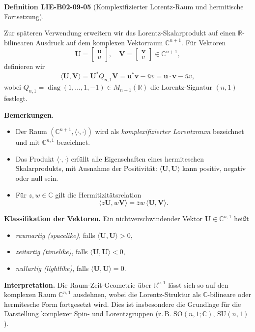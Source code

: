 \documentclass[10pt, letterpaper]{article}
\newcommand{\CustomHeading}[3]{%
  \par\medskip\noindent%
  \textbf{#1 #2} \textnormal{(#3)}.\enskip%
}
\newenvironment{DEF}[2]{\begin{unitbox}\CustomHeading{Definition}{#1}{#2}}{\end{unitbox}}
\begin{document}
\begin{DEF}{LIE-B02-09-05}{Komplexifizierter Lorentz-Raum und hermitische Fortsetzung}
Zur späteren Verwendung erweitern wir das Lorentz-Skalarprodukt auf einen
\(\mathbb{R}\)-bilinearen Ausdruck auf dem komplexen Vektorraum
\(\mathbb{C}^{n+1}\).
Für Vektoren
\[
\mathbf{U}=
\begin{bmatrix}
\mathbf{u}\\u
\end{bmatrix},
\quad
\mathbf{V}=
\begin{bmatrix}
\mathbf{v}\\v
\end{bmatrix}
\in\mathbb{C}^{n+1},
\]
definieren wir
\[
\langle \mathbf{U},\mathbf{V}\rangle
=\mathbf{U}^{*} Q_{n,1}\mathbf{V}
=\mathbf{u}^{*}\mathbf{v}-\bar{u}v
=\mathbf{u}\cdot\mathbf{v}-\bar{u}v,
\]
wobei \(Q_{n,1}=\operatorname{diag}(1,\dots,1,-1)\in M_{n+1}(\mathbb{R})\)
die Lorentz-Signatur \((n,1)\) festlegt.

\textbf{Bemerkungen.}
\begin{itemize}
  \item Der Raum \((\mathbb{C}^{n+1},\langle\cdot,\cdot\rangle)\) wird als
  \emph{komplexifizierter Lorentzraum} bezeichnet und mit
  \(\mathbb{C}^{n,1}\) bezeichnet.
  \item Das Produkt \(\langle\cdot,\cdot\rangle\) erfüllt alle Eigenschaften eines
  hermiteschen Skalarprodukts, mit Ausnahme der Positivität:
  \(\langle \mathbf{U},\mathbf{U}\rangle\) kann positiv, negativ oder null sein.
  \item Für \(z,w\in\mathbb{C}\) gilt die Hermitizitätsrelation
  \[
  \langle z\mathbf{U}, w\mathbf{V}\rangle
  =\bar{z}w\,\langle\mathbf{U},\mathbf{V}\rangle.
  \]
\end{itemize}

\textbf{Klassifikation der Vektoren.}
Ein nichtverschwindender Vektor
\(\mathbf{U}\in\mathbb{C}^{n,1}\) heißt
\begin{itemize}
  \item \emph{raumartig (spacelike)}, falls \(\langle \mathbf{U},\mathbf{U}\rangle>0\),
  \item \emph{zeitartig (timelike)}, falls \(\langle \mathbf{U},\mathbf{U}\rangle<0\),
  \item \emph{nullartig (lightlike)}, falls \(\langle \mathbf{U},\mathbf{U}\rangle=0\).
\end{itemize}

\textbf{Interpretation.}
Die Raum-Zeit-Geometrie über \(\mathbb{R}^{n,1}\) lässt sich so auf
den komplexen Raum \(\mathbb{C}^{n,1}\) ausdehnen, wobei die Lorentz-Struktur
als \(\mathbb{C}\)-bilineare oder hermitesche Form fortgesetzt wird.
Dies ist insbesondere die Grundlage für die Darstellung komplexer
Spin- und Lorentzgruppen (z.\,B. \(\mathrm{SO}(n,1;\mathbb{C})\),
\(\mathrm{SU}(n,1)\)).
\end{DEF}
\end{document}
